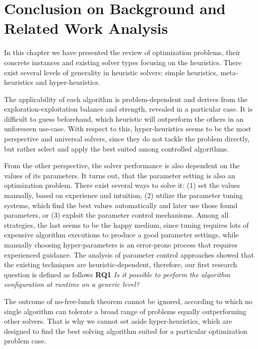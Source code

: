 \section{Conclusion on Background and Related Work Analysis}\label{bg: conclusion}
In this chapter we have presented the review of optimization problems, their concrete instances and existing solver types focusing on the heuristics.
There exist several levels of generality in heuristic solvers: simple heuristics, meta-heuristics and hyper-heuristics.

The applicability of each algorithm is problem-dependent and derives from the exploration-exploitation balance and strength, revealed in a particular case.
It is difficult to guess beforehand, which heuristic will outperform the others in an unforeseen use-case.
With respect to this, hyper-heuristics seems to be the most perspective and universal solvers, since they do not tackle the problem directly, but rather select and apply the best suited among controlled algorithms.

From the other perspective, the solver performance is also dependent on the values of its parameters.
It turns out, that the parameter setting is also an optimization problem.
There exist several ways to solve it: (1) set the values manually, based on experience and intuition, (2) utilize the parameter tuning systems, which find the best values automatically and later use those found parameters, or (3) exploit the parameter control mechanisms.
Among all strategies, the last seems to be the happy medium, since tuning requires lots of expensive algorithm executions to produce a good parameter settings, while manually choosing hyper-parameters is an error-prone process that requires experienced guidance. The analysis of parameter control approaches showed that the existing techniques are heuristic-dependent, therefore, our first research question is defined as follows \textbf{RQ1} \emph{Is it possible to perform the algorithm configuration at runtime on a generic level?}

The outcome of no-free-lunch theorem cannot be ignored, according to which no single algorithm can tolerate a broad range of problems equally outperforming other solvers. That is why we cannot set aside hyper-heuristics, which are designed to find the best solving algorithm suited for a particular optimization problem case.


